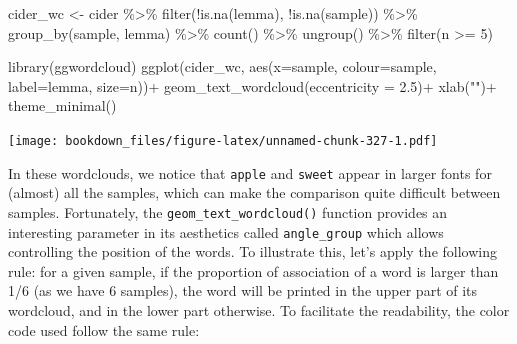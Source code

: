 \documentclass[
]{krantz}
\makeatletter
\newenvironment{Shaded}{\begin{snugshade}}{\end{snugshade}}
\newcommand{\AttributeTok}[1]{\textcolor[rgb]{0.61,0.61,0.61}{#1}}
\newcommand{\DecValTok}[1]{\textcolor[rgb]{0.06,0.06,0.06}{#1}}
\newcommand{\FloatTok}[1]{\textcolor[rgb]{0.06,0.06,0.06}{#1}}
\newcommand{\FunctionTok}[1]{\textcolor[rgb]{0,0,0}{#1}}
\newcommand{\NormalTok}[1]{#1}
\newcommand{\OtherTok}[1]{\textcolor[rgb]{0.37,0.37,0.37}{#1}}
\newcommand{\SpecialCharTok}[1]{\textcolor[rgb]{0,0,0}{#1}}
\newcommand{\StringTok}[1]{\textcolor[rgb]{0.5,0.5,0.5}{#1}}
\newenvironment{kframe}{%
\medskip{}
\setlength{\fboxsep}{.8em}
 \def\at@end@of@kframe{}%
 \ifinner\ifhmode%
  \def\at@end@of@kframe{\end{minipage}}%
  \begin{minipage}{\columnwidth}%
 \fi\fi%
 \def\FrameCommand##1{\hskip\@totalleftmargin \hskip-\fboxsep
 \colorbox{shadecolor}{##1}\hskip-\fboxsep
     \hskip-\linewidth \hskip-\@totalleftmargin \hskip\columnwidth}%
 \MakeFramed {\advance\hsize-\width
   \@totalleftmargin\z@ \linewidth\hsize
   \@setminipage}}%
 {\par\unskip\endMakeFramed%
 \at@end@of@kframe}
\renewenvironment{Shaded}{\begin{kframe}}{\end{kframe}}
\makeatother
\begin{document}
\begin{Shaded}
\begin{Highlighting}[]
\NormalTok{cider\_wc }\OtherTok{\textless{}{-}}\NormalTok{ cider }\SpecialCharTok{\%\textgreater{}\%} 
  \FunctionTok{filter}\NormalTok{(}\SpecialCharTok{!}\FunctionTok{is.na}\NormalTok{(lemma), }\SpecialCharTok{!}\FunctionTok{is.na}\NormalTok{(sample)) }\SpecialCharTok{\%\textgreater{}\%} 
  \FunctionTok{group\_by}\NormalTok{(sample, lemma) }\SpecialCharTok{\%\textgreater{}\%} 
  \FunctionTok{count}\NormalTok{() }\SpecialCharTok{\%\textgreater{}\%} 
  \FunctionTok{ungroup}\NormalTok{() }\SpecialCharTok{\%\textgreater{}\%} 
  \FunctionTok{filter}\NormalTok{(n }\SpecialCharTok{\textgreater{}=} \DecValTok{5}\NormalTok{)}

\FunctionTok{library}\NormalTok{(ggwordcloud)}
\FunctionTok{ggplot}\NormalTok{(cider\_wc, }\FunctionTok{aes}\NormalTok{(}\AttributeTok{x=}\NormalTok{sample, }\AttributeTok{colour=}\NormalTok{sample, }\AttributeTok{label=}\NormalTok{lemma, }\AttributeTok{size=}\NormalTok{n))}\SpecialCharTok{+}
  \FunctionTok{geom\_text\_wordcloud}\NormalTok{(}\AttributeTok{eccentricity =} \FloatTok{2.5}\NormalTok{)}\SpecialCharTok{+}
  \FunctionTok{xlab}\NormalTok{(}\StringTok{""}\NormalTok{)}\SpecialCharTok{+}
  \FunctionTok{theme\_minimal}\NormalTok{()}
\end{Highlighting}
\end{Shaded}

\texttt{[image: bookdown\_files/figure-latex/unnamed-chunk-327-1.pdf]}

In these wordclouds, we notice that \texttt{apple} and \texttt{sweet} appear in larger fonts for (almost) all the samples, which can make the comparison quite difficult between samples. Fortunately, the \texttt{geom\_text\_wordcloud()} function provides an interesting parameter in its aesthetics called \texttt{angle\_group} which allows controlling the position of the words. To illustrate this, let's apply the following rule: for a given sample, if the proportion of association of a word is larger than 1/6 (as we have 6 samples), the word will be printed in the upper part of its wordcloud, and in the lower part otherwise. To facilitate the readability, the color code used follow the same rule:
\end{document}

